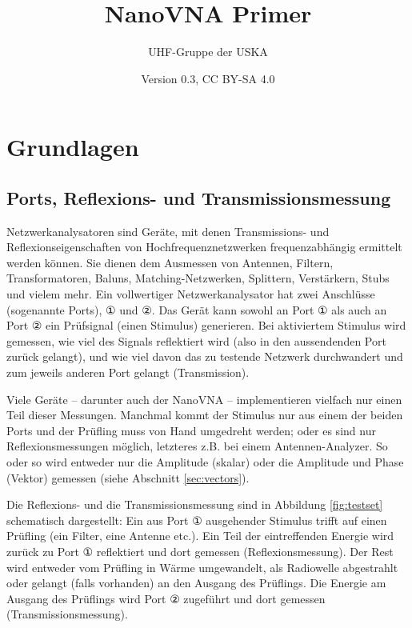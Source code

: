 \documentclass[twoside,a4paper,11pt,halfparskip,DIV=11,notitlepage]{scrartcl}
\title{NanoVNA Primer}
\author{\sf UHF-Gruppe der USKA}
\date{\sf Version 0.3, CC BY-SA 4.0 \ccbysa}
\begin{document}
\maketitle
\thispagestyle{empty}

\setcounter{tocdepth}{1}
\tableofcontents



\newpage


\section{Grundlagen}

\subsection{Ports, Reflexions- und Transmissionsmessung}\label{sec:ports}
Netzwerkanalysatoren sind Geräte, mit denen Transmissions- und
Reflexionseigenschaften von Hochfrequenznetzwerken frequenzabhängig ermittelt
werden können. Sie dienen dem Ausmessen von Antennen, Filtern, Transformatoren,
Baluns, Matching-Netzwerken, Splittern, Verstärkern, Stubs und vielem mehr. Ein
vollwertiger Netzwerkanalysator hat zwei Anschlüsse (sogenannte Ports), ① und ②.
Das Gerät kann sowohl an Port ① als auch an Port ② ein Prüfsignal (einen 
Stimulus) generieren. Bei aktiviertem Stimulus wird gemessen, wie viel des
Signals reflektiert wird (also in den aussendenden Port zurück gelangt), und
wie viel davon das zu testende Netzwerk durchwandert und zum jeweils anderen
Port gelangt (Transmission).

Viele Geräte -- darunter auch der NanoVNA -- implementieren vielfach nur einen Teil
dieser Messungen. Manchmal kommt der Stimulus nur aus einem der beiden Ports
und der Prüfling muss von Hand umgedreht werden; oder es sind nur
Reflexionsmessungen möglich, letzteres z.B. bei einem Antennen-Analyzer. So
oder so wird entweder nur die Amplitude (skalar) oder die Amplitude und Phase
(Vektor) gemessen (siehe Abschnitt \ref{sec:vectors}).

Die Reflexions- und die Transmissionsmessung sind in
Abbildung \ref{fig:testset} schematisch dargestellt: Ein aus Port ① ausgehender
Stimulus trifft auf einen Prüfling (ein Filter, eine Antenne etc.). Ein Teil
der eintreffenden Energie wird zurück zu Port ① reflektiert und dort gemessen
(Reflexionsmessung). Der Rest wird entweder vom Prüfling in Wärme umgewandelt,
als Radiowelle abgestrahlt oder gelangt (falls vorhanden) an den Ausgang des
Prüflings. Die Energie am Ausgang des Prüflings wird Port ② zugeführt
und dort gemessen (Transmissionsmessung).
\end{document}
